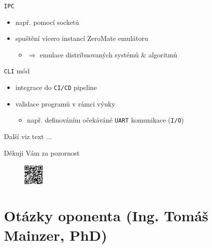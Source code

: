 \documentclass[compress]{beamer}
\begin{document}
\begin{frame}
	\begin{block}{\texttt{IPC}}
		\begin{itemize}
			\item např. pomocí socketů
			\item spuštění vícero instancí ZeroMate emulátoru
			\begin{itemize}
				\item $\Rightarrow$ emulace distribuovaných systémů \& algoritmů
			\end{itemize}
		\end{itemize}
	\end{block}
	\begin{block}{\texttt{CLI} mód}
		\begin{itemize}
			\item integrace do \texttt{CI/CD} pipeline
			\item validace programů v rámci výuky
			\begin{itemize}
				\item např. definováním očekáváné \texttt{UART} komunikace (\texttt{I/O})
			\end{itemize}
		\end{itemize}
	\end{block}
	\noindent\makebox[\linewidth]{\rule{\textwidth}{0.4pt}}
	Další viz text \href{https://github.com/silhavyj/ZeroMate/blob/main/docs/latex/DP_silhavyj_A21N0072P.pdf}{}...
\end{frame}

\begin{frame}
  \centering \Large
  Děkuji Vám za pozornost\\
  \href{https://github.com/silhavyj/ZeroMate}{}
  \begin{figure}
  	\centering
  	\includegraphics[width=0.10\textwidth]{img/qr-code.pdf}
  \end{figure}
\end{frame}

\appendix

\section{Otázky oponenta (Ing. Tomáš Mainzer, PhD)}
\end{document}
